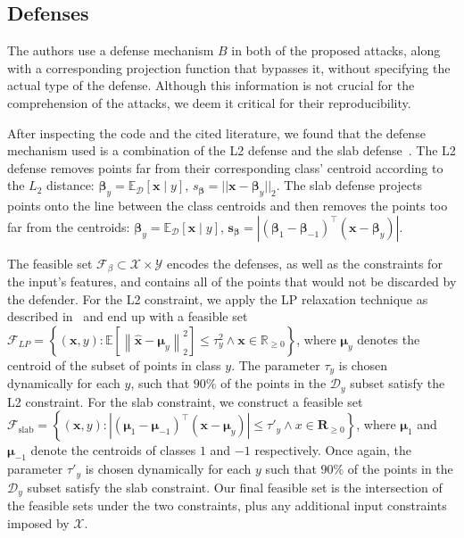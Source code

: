 \subsection{Defenses}
\label{sec:Defenses}
The authors use a defense mechanism $B$ in both of the proposed attacks, along with a corresponding projection function that bypasses it, without specifying the actual type of the defense. Although this information is not crucial for the comprehension of the attacks, we deem it critical for their reproducibility.

After inspecting the code and the cited literature, we found that the defense mechanism used is a combination of the L2 defense and the slab defense~\cite{steinhardt2017defenses}. The L2 defense removes points far from their corresponding class' centroid according to the $L_2$ distance: $\boldsymbol{\beta}_{y}=\mathbb{E}_{\mathcal{D}}[\mathbf{x}\mid y]$, $s_{\boldsymbol{\beta}}=||\mathbf{x}-\boldsymbol{\beta}_{y}||_2$. The slab defense projects points onto the line between the class centroids and then removes the points too far from the centroids: $\boldsymbol{\beta}_{y}=\mathbb{E}_{\mathcal{D}}[\mathbf{x}\mid y]$, $\mathbf{s}_{\boldsymbol{\beta}}=\left|(\boldsymbol{\beta}_{1}-\boldsymbol{\beta}_{-1})^\top (\mathbf{x}-\boldsymbol{\beta}_y)\right|$.

The feasible set $\mathcal{F}_\beta\subset\mathcal{X}\times\mathcal{Y}$
encodes the defenses, as well as the constraints for the input's features, and contains all of the points that would not be discarded by the defender. For the L2 constraint, we apply the LP relaxation technique as described in~\cite{koh2018} and end up with a feasible set $\mathcal{F}_{L P}=\left\{(\mathbf{x}, y): \mathbb{E}\left[\left\|\hat{\mathbf{x}}-\boldsymbol{\mu}_{y}\right\|_{2}^{2}\right] \leq \tau_{y}^{2} \land \mathbf{x} \in \mathbb{R}_{\geq 0}\right\}$, where $\boldsymbol{\mu}_{y}$ denotes the centroid of the subset of points in class $y$. The parameter $\tau_{y}$ is chosen dynamically for each $y$, such that $90\%$ of the points in the $\mathcal{D}_{y}$ subset satisfy the L2 constraint. For the slab constraint, we construct a feasible set $\mathcal{F}_{\mathrm{slab}}=\left\{(\mathbf{x},y): |(\boldsymbol{\mu}_{1}-\boldsymbol{\mu}_{-1})^\top (\mathbf{x}-\boldsymbol{\mu}_{y})| \leq \tau'_y \land x\in\mathbf{R}_{\geq 0}\right\}$, where $\boldsymbol{\mu}_1$ and $\boldsymbol{\mu}_{-1}$ denote the centroids of classes $1$ and $-1$ respectively. Once again, the parameter $\tau'_y$ is chosen dynamically for each $y$ such that $90\%$ of the points in the $\mathcal{D}_y$ subset satisfy the slab constraint. Our final feasible set is the intersection of the feasible sets under the two constraints, plus any additional input constraints imposed by $\mathcal{X}$.

